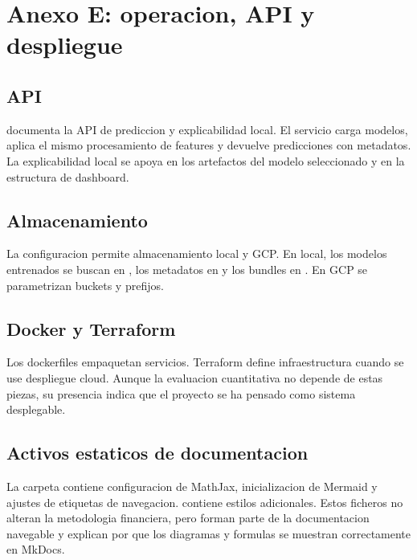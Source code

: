 \chapter{Anexo E: operacion, API y despliegue}

\section{API}

 documenta la API de prediccion y explicabilidad local. El servicio carga modelos, aplica el mismo procesamiento de features y devuelve predicciones con metadatos. La explicabilidad local se apoya en los artefactos del modelo seleccionado y en la estructura de dashboard.

\section{Almacenamiento}

La configuracion permite almacenamiento local y GCP. En local, los modelos entrenados se buscan en , los metadatos en  y los bundles en . En GCP se parametrizan buckets y prefijos.

\section{Docker y Terraform}

Los dockerfiles empaquetan servicios. Terraform define infraestructura cuando se use despliegue cloud. Aunque la evaluacion cuantitativa no depende de estas piezas, su presencia indica que el proyecto se ha pensado como sistema desplegable.

\section{Activos estaticos de documentacion}

La carpeta  contiene configuracion de MathJax, inicializacion de Mermaid y ajustes de etiquetas de navegacion.  contiene estilos adicionales. Estos ficheros no alteran la metodologia financiera, pero forman parte de la documentacion navegable y explican por que los diagramas y formulas se muestran correctamente en MkDocs.
